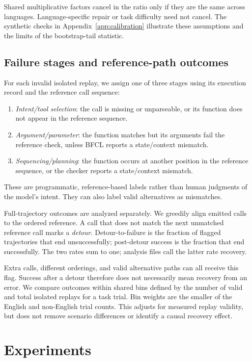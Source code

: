 \documentclass[11pt]{article}
\begin{document}
Shared multiplicative factors cancel in the ratio only if they are the same
across languages. Language-specific repair or task difficulty need not
cancel. The synthetic checks in Appendix~\ref{app:calibration} illustrate
these assumptions and the limits of the bootstrap-tail statistic.

\subsection{Failure stages and reference-path outcomes}
For each invalid isolated replay, we assign one of three stages using its
execution record and the reference call sequence:
\begin{enumerate}
\itemsep0.1em
\item \emph{Intent/tool selection}: the call is missing or unparseable,
or its function does not appear in the reference sequence.
\item \emph{Argument/parameter}: the function matches but its arguments
fail the reference check, unless BFCL reports a state/context mismatch.
\item \emph{Sequencing/planning}: the function occurs at another position
in the reference sequence, or the checker reports a state/context mismatch.
\end{enumerate}
These are programmatic, reference-based labels rather than human judgments
of the model's intent. They can also label valid alternatives as mismatches.

Full-trajectory outcomes are analyzed separately. We greedily align emitted
calls to the ordered reference. A call that does not match the next unmatched
reference call marks a \emph{detour}. Detour-to-failure is the fraction of
flagged trajectories that end unsuccessfully; post-detour success is the
fraction that end successfully. The two rates sum to one; analysis files call the latter rate recovery.

Extra calls, different orderings, and valid alternative paths can all receive
this flag. Success after a detour therefore does not necessarily mean recovery
from an error. We compare outcomes within shared bins defined by the number
of valid and total isolated replays for a task trial. Bin weights are the
smaller of the English and non-English trial counts. This adjusts for measured
replay validity, but does not remove scenario differences or identify a causal
recovery effect.

\section{Experiments}
\label{sec:experiments}
\end{document}
